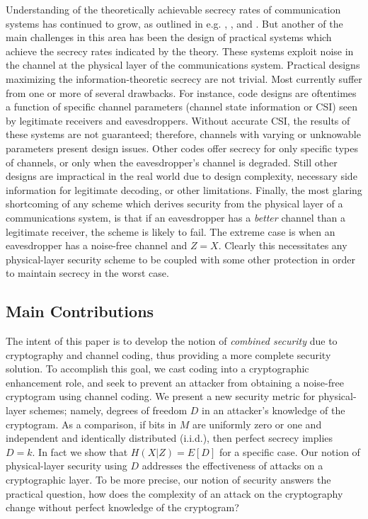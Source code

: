 \documentclass[10pt,twocolumn,twoside]{IEEEtran} \newlength{\pic}
\theoremstyle{definition}
\theoremstyle{remark}
\theoremstyle{plain}
\begin{document}
Understanding of the theoretically achievable secrecy rates of communication systems has continued to grow, as outlined in e.g. \cite{Wyner84}, \cite{Bloch06}, and \cite{Maurer00}. But another of the main challenges in this area has been the design of practical systems which achieve the secrecy rates indicated by the theory. These systems exploit noise in the channel at the physical layer of the communications system. Practical designs maximizing the information-theoretic secrecy are not trivial. Most currently suffer from one or more of several drawbacks. For instance, code designs are oftentimes a function of specific channel parameters (channel state information or CSI) seen by legitimate receivers and eavesdroppers.  Without accurate CSI, the results of these systems are not guaranteed; therefore, channels with varying or unknowable parameters present design issues. Other codes offer secrecy for only specific types of channels, or only when the eavesdropper's channel is degraded. Still other designs are impractical in the real world due to design complexity, necessary side information for legitimate decoding, or other limitations. Finally, the most glaring shortcoming of any scheme which derives security from the physical layer of a communications system, is that if an eavesdropper has a \emph{better} channel than a legitimate receiver, the scheme is likely to fail. The extreme case is when an eavesdropper has a noise-free channel and $Z=X$. Clearly this necessitates any physical-layer security scheme to be coupled with some other protection in order to maintain secrecy in the worst case.

\subsection{Main Contributions}

The intent of this paper is to develop the notion of \emph{combined security} due to cryptography and channel coding, thus providing a more complete security solution. To accomplish this goal, we cast coding into a cryptographic enhancement role, and seek to prevent an attacker from obtaining a noise-free cryptogram using channel coding. We present a new security metric for physical-layer schemes; namely, degrees of freedom $D$ in an attacker's knowledge of the cryptogram. As a comparison, if bits in $M$ are uniformly zero or one and independent and identically distributed (i.i.d.), then perfect secrecy implies $D=k$. In fact we show that $H(X|Z) = E[D]$ for a specific case. Our notion of physical-layer security using $D$ addresses the effectiveness of attacks on a cryptographic layer. To be more precise, our notion of security answers the practical question, how does the complexity of an attack on the cryptography change without perfect knowledge of the cryptogram?
\end{document}
